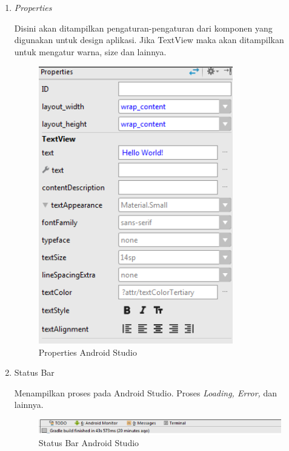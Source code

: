 \begin{enumerate}
    \item\textit{Properties}
    \par Disini akan ditampilkan pengaturan-pengaturan dari komponen yang digunakan untuk design aplikasi. Jika TextView maka akan ditampilkan untuk mengatur warna, size dan lainnya.
    \begin{figure}[H]
    \centering
    \includegraphics[width=0.8\textwidth]{figures/android20.png}
    \caption{Properties Android Studio}
    \label{print}
    \end{figure}
    
    \item Status Bar
    \par Menampilkan proses pada Android Studio. Proses \textit{Loading, Error,} dan lainnya.
    \begin{figure}[H]
    \centering
    \includegraphics[width=1\textwidth]{figures/android21.png}
    \caption{Status Bar Android Studio}
    \label{print}
    \end{figure}
\end{enumerate}

